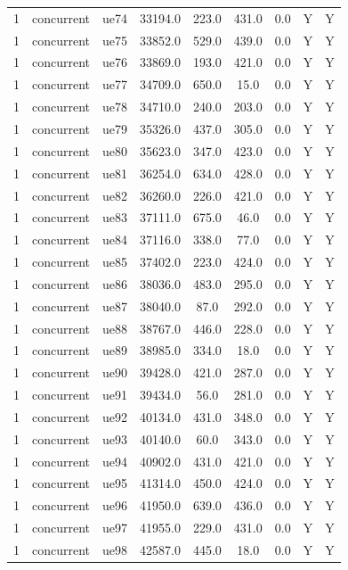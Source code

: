 \begin{table}[ht]
\begin{tabular}{|c|c|c|c|c|c|c|c|c|}
1 & concurrent & ue74 & 33194.0 & 223.0 & 431.0 & 0.0 & Y & Y \\
1 & concurrent & ue75 & 33852.0 & 529.0 & 439.0 & 0.0 & Y & Y \\
1 & concurrent & ue76 & 33869.0 & 193.0 & 421.0 & 0.0 & Y & Y \\
1 & concurrent & ue77 & 34709.0 & 650.0 & 15.0 & 0.0 & Y & Y \\
1 & concurrent & ue78 & 34710.0 & 240.0 & 203.0 & 0.0 & Y & Y \\
1 & concurrent & ue79 & 35326.0 & 437.0 & 305.0 & 0.0 & Y & Y \\
1 & concurrent & ue80 & 35623.0 & 347.0 & 423.0 & 0.0 & Y & Y \\
1 & concurrent & ue81 & 36254.0 & 634.0 & 428.0 & 0.0 & Y & Y \\
1 & concurrent & ue82 & 36260.0 & 226.0 & 421.0 & 0.0 & Y & Y \\
1 & concurrent & ue83 & 37111.0 & 675.0 & 46.0 & 0.0 & Y & Y \\
1 & concurrent & ue84 & 37116.0 & 338.0 & 77.0 & 0.0 & Y & Y \\
1 & concurrent & ue85 & 37402.0 & 223.0 & 424.0 & 0.0 & Y & Y \\
1 & concurrent & ue86 & 38036.0 & 483.0 & 295.0 & 0.0 & Y & Y \\
1 & concurrent & ue87 & 38040.0 & 87.0 & 292.0 & 0.0 & Y & Y \\
1 & concurrent & ue88 & 38767.0 & 446.0 & 228.0 & 0.0 & Y & Y \\
1 & concurrent & ue89 & 38985.0 & 334.0 & 18.0 & 0.0 & Y & Y \\
1 & concurrent & ue90 & 39428.0 & 421.0 & 287.0 & 0.0 & Y & Y \\
1 & concurrent & ue91 & 39434.0 & 56.0 & 281.0 & 0.0 & Y & Y \\
1 & concurrent & ue92 & 40134.0 & 431.0 & 348.0 & 0.0 & Y & Y \\
1 & concurrent & ue93 & 40140.0 & 60.0 & 343.0 & 0.0 & Y & Y \\
1 & concurrent & ue94 & 40902.0 & 431.0 & 421.0 & 0.0 & Y & Y \\
1 & concurrent & ue95 & 41314.0 & 450.0 & 424.0 & 0.0 & Y & Y \\
1 & concurrent & ue96 & 41950.0 & 639.0 & 436.0 & 0.0 & Y & Y \\
1 & concurrent & ue97 & 41955.0 & 229.0 & 431.0 & 0.0 & Y & Y \\
1 & concurrent & ue98 & 42587.0 & 445.0 & 18.0 & 0.0 & Y & Y \\

\end{tabular}
\end{table}
